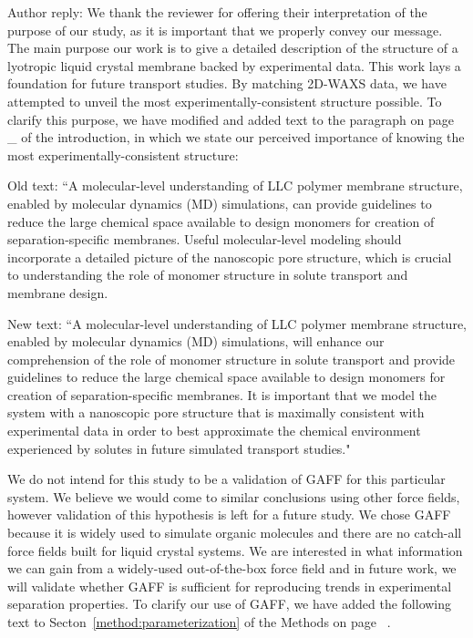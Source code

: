 \documentclass{article}
\begin{document}
\begin{enumerate}
\begin{quote}
    \end{quote}

    Author reply: We thank the reviewer for offering their interpretation of
    the purpose of our study, as it is important that we properly convey our
    message. The main purpose our work is to give a detailed description of the
    structure of a lyotropic liquid crystal membrane backed by experimental data.
    This work lays a foundation for future transport studies. By matching 2D-WAXS
    data, we have attempted to unveil the most experimentally-consistent structure
    possible. To clarify this purpose, we have modified and added text to the
    paragraph on page \_ of the introduction, in which we state our perceived
    importance of knowing the most experimentally-consistent structure:

    Old text: ``A molecular-level understanding of LLC polymer membrane
    structure, enabled by molecular dynamics (MD) simulations, can provide
    guidelines to reduce the large chemical space available to design monomers for
    creation of separation-specific membranes. Useful molecular-level modeling
    should incorporate a detailed picture of the nanoscopic pore structure, which
    is crucial to understanding the role of monomer structure in solute transport
    and membrane design. 

    New text: ``A molecular-level understanding of LLC polymer membrane
    structure, enabled by molecular dynamics (MD) simulations, will enhance our
    comprehension of the role of monomer structure in solute transport and provide
    guidelines to reduce the large chemical space available to design monomers for
    creation of separation-specific membranes. It is important that we model the
    system with a nanoscopic pore structure that is maximally consistent with
    experimental data in order to best approximate the chemical environment experienced
    by solutes in future simulated transport studies."


    We do not intend for this study to be a validation of GAFF for this
    particular system. We believe we would come to similar conclusions using other
    force fields, however validation of this hypothesis is left for a future study.
    We chose GAFF because it is widely used to simulate organic molecules and there
    are no catch-all force fields built for liquid crystal systems. We are interested in
    what information we can gain from a widely-used out-of-the-box force field and in future
    work, we will validate whether GAFF is sufficient for reproducing trends in
    experimental separation properties. To clarify our use of GAFF, we have added
    the following text to Secton~\ref{method:parameterization} of the Methods on
    page ~\pageref{method:parameterization}.


\end{enumerate}
\end{document}
